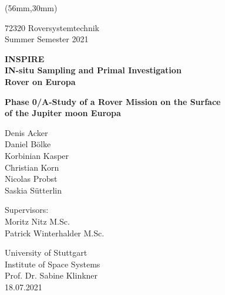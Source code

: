 %
%

\begin{titlepage}
	
	\begin{textblock*}{117mm}(56mm,30mm)
		
		\begin{center}
		
		
			72320 Roversystemtechnik \\
			Summer Semester 2021
			
			
			\vspace{20mm}
			
			\large \textbf{INSPIRE} \\ 
			\vspace{5mm}
			\large \textbf{IN-situ Sampling and Primal Investigation \\ Rover on Europa}
			
			\vspace{20mm}
			
			\large \textbf{Phase 0/A-Study of a Rover Mission on the Surface \\ of the Jupiter moon Europa}
			
			\vspace{30mm}
			
			\normalsize 
			Denis Acker \\
			Daniel Bölke \\
			Korbinian Kasper \\
			Christian Korn \\
			Nicolas Probst \\
			Saskia Sütterlin \\
			
			
			\vspace{40mm}
			
			Supervisors: \\
			Moritz Nitz M.Sc. \\
			Patrick Winterhalder M.Sc. 
			
			\vspace{20mm}
			
			University of Stuttgart \\
			Institute of Space Systems \\
			Prof. Dr. Sabine Klinkner \\
			18.07.2021
			
		\end{center}
	
	\end{textblock*}
	
\end{titlepage}



